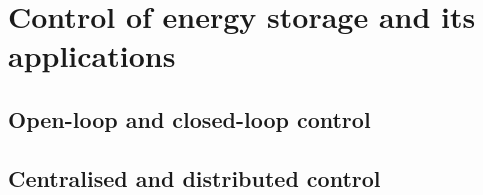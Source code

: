 \section{Control of energy storage and its applications}
\label{ch-literature:sec:control-of-energy-storage}


\subsection{Open-loop and closed-loop control}
\label{ch-literature:subsec:open-loop-and-closed-loop-control}


\subsection{Centralised and distributed control}
\label{ch-literature:subsec:centralised-and-distributed-control}